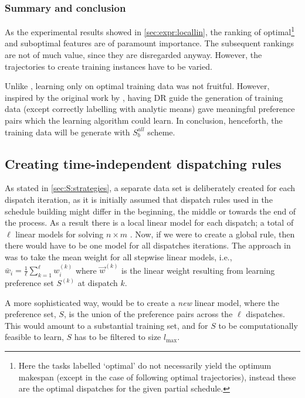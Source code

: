 \subsubsection{Summary and conclusion }
As the experimental results showed in \cref{sec:expr:locallin}, the ranking of optimal\footnote{Here the tasks labelled `optimal' do not necessarily yield the optimum makespan (except in the case of following optimal trajectories), instead these are the optimal dispatches for the given partial schedule.} and suboptimal features are of paramount importance. The subsequent rankings are not of much value, since they are disregarded anyway. However, the trajectories to create training instances have to be varied.

Unlike \citep{Siggi10,Malik08,Russell09}, learning only on optimal training data was not fruitful. However, inspired by the original work by \cite{Siggi05}, having DR guide the generation of training data (except correctly labelling with analytic means) gave meaningful preference pairs which the learning algorithm could learn. In conclusion, henceforth, the training data will be generate with $S_{b}^{all}$ scheme.

\subsection{Creating time-independent dispatching rules}\label{sec:pref:scalability}
As stated in \cref{sec:S:strategies}, a separate data set is deliberately created for each dispatch iteration, as it is initially assumed that dispatch rules used in the schedule building might differ in the beginning, the middle or towards the end of the process. As a result there is a local linear model for each dispatch; a total of $\ell$ linear models for solving $n\times m$ \jsp. Now, if we were to create a global rule, then there would have to be one model for all dispatches iterations. The approach in \cite{InRu11a} was to take the mean weight for all stepwise linear models, i.e., $\bar{w}_i=\frac{1}{\ell}\sum_{k=1}^{\ell}w_i^{(k)}$ where $\vec{w}^{(k)}$ is the linear weight resulting from learning preference set $S^{(k)}$ at dispatch $k$. 

A more sophisticated way, would be to create a \emph{new} linear model, where the preference set, $S$, is the union of the preference pairs across the $\ell$ dispatches. This would amount to a substantial training set, and for $S$ to be computationally feasible to learn, $S$ has to be filtered to size $l_{\max}$.

